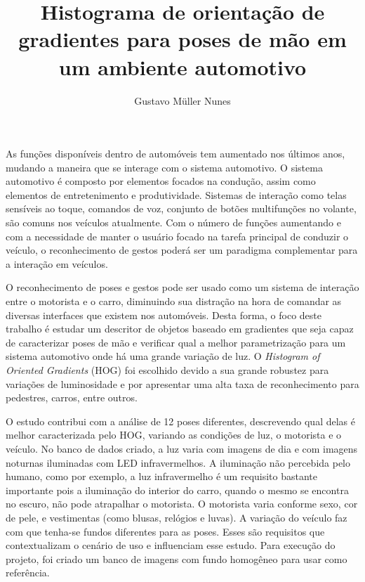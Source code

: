 \documentclass[rascunho]{fei}
\author{Gustavo Müller Nunes}
\title{Histograma de orientação de gradientes para poses de mão em um ambiente automotivo}
\begin{document}
	\maketitle
	
	
	
	
	
	
\begin{resumo}
 As funções disponíveis dentro de automóveis tem aumentado nos últimos anos, mudando a maneira que se interage com o sistema automotivo. O sistema automotivo é composto por elementos focados na condução, assim como elementos de entretenimento e produtividade. Sistemas de interação como telas sensíveis ao toque, comandos de voz, conjunto de botões multifunções no volante, são comuns nos veículos atualmente. Com o número de funções aumentando e com a necessidade de manter o usuário focado na tarefa principal de conduzir o veículo, o reconhecimento de gestos poderá ser um paradigma complementar para a interação em veículos. 

 O reconhecimento de poses e gestos pode ser usado como um sistema de interação entre o motorista e o carro, diminuindo sua distração na hora de comandar as diversas interfaces que existem nos automóveis. Desta forma, o foco deste trabalho é estudar um descritor de objetos baseado em gradientes que seja capaz de caracterizar poses de mão e verificar qual a melhor parametrização para um sistema automotivo onde há uma grande variação de luz. O \textit{Histogram of Oriented Gradients} (HOG) foi escolhido devido a sua grande robustez para variações de luminosidade e por apresentar uma alta taxa de reconhecimento para pedestres, carros, entre outros.

O estudo contribui com a análise de 12 poses diferentes, descrevendo qual delas é melhor caracterizada pelo HOG, variando as condições de luz, o motorista e o veículo. No banco de dados criado, a luz varia com imagens de dia e com imagens noturnas iluminadas com LED infravermelhos. A iluminação não percebida pelo humano, como por exemplo, a luz infravermelho é um requisito bastante importante pois a iluminação do interior do carro, quando o mesmo se encontra no escuro, não pode atrapalhar o motorista. O motorista varia conforme sexo, cor de pele, e vestimentas (como blusas, relógios e luvas). A variação do veículo faz com que tenha-se fundos diferentes para as poses. Esses são requisitos que contextualizam o cenário de uso e influenciam esse estudo. Para execução do projeto, foi criado um banco de imagens com fundo homogêneo para usar como referência.


\end{resumo}
\end{document}
